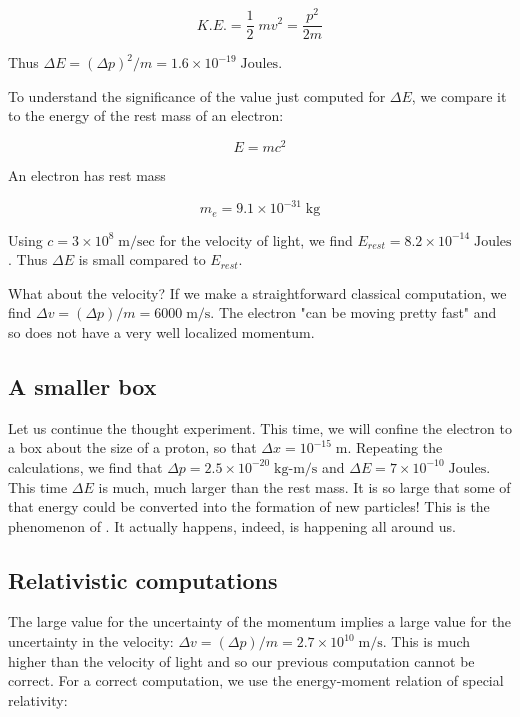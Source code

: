 \begin{equation}
  K.E. = \frac{1}{2}\;mv^2 = \frac{p^2}{2m}
\end{equation}

Thus $\Delta E = (\Delta p)^2/m = 1.6\times 10^{-19}\; \text{Joules}$. 

To understand the significance of the value just computed for $\Delta E$, we compare it to the energy of the rest mass of an electron:

\begin{equation}
E = mc^2
\end{equation}

An electron has rest mass

\begin{equation}
m_e = 9.1\times 10^{-31}\;\text{kg}
\end{equation}

Using  $c = 3\times 10^8\;\text{m/sec}$ for the velocity of light, we find $E_{rest} = 8.2\times 10^{-14}\; \text{Joules}$.  Thus $\Delta E$ is small compared to $E_{rest}$.

What about the velocity?  If we make a straightforward classical computation, we find $\Delta v = (\Delta p)/m = 6000\;\text{m/s}$.  The electron  "can be moving pretty fast" and so does not have a very well localized momentum.

\subsection{A smaller box}

Let us continue the thought experiment. This time, we will confine the electron to a box about the size of a proton, so that $\Delta x = 10^{-15}\;\text{m}$.  Repeating the calculations, we find that $\Delta p = 2.5\times 10^{-20}\;\text{kg-m/s}$ and $\Delta E = 7\times 10^{-10}\;\text{Joules}$.  This time $\Delta E$ is much, much larger than the rest mass. It is so large that some of that energy could be converted into the formation of new particles!  This is the phenomenon of .  It actually happens, indeed, is happening all around us.  

\subsection{ Relativistic computations}

The large value for the uncertainty of the momentum implies a large value for the uncertainty in the velocity: $\Delta v = (\Delta p)/m = 2.7\times 10^{10}\;\text{m/s}$.  This is much higher than the velocity of light and so our previous computation cannot be correct.  For a correct computation, we use the energy-moment relation of special relativity:

